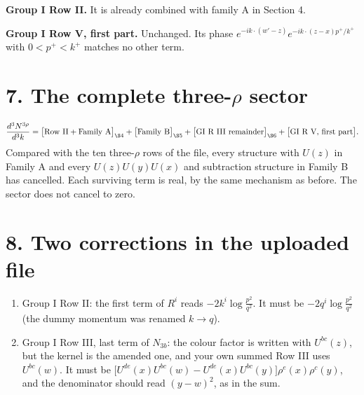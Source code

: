 \documentclass[10pt]{article}
\begin{document}
\noindent\textbf{Group I Row II.} It is already combined with family A in Section 4.

\noindent\textbf{Group I Row V, first part.} Unchanged. Its phase $e^{-ik\cdot(w'-z)}e^{-ik\cdot(z-x)p^{+}/k^{+}}$ with $0<p^{+}<k^{+}$ matches no other term.

\section*{7. The complete three-$\rho$ sector}
\begin{equation}
\frac{d^{3}N^{3\rho}}{d^{3}k}=\big[\text{Row II}+\text{Family A}\big]_{\S4}+\big[\text{Family B}\big]_{\S5}+\big[\text{GI R III remainder}\big]_{\S6}+\big[\text{GI R V, first part}\big].
\end{equation}
Compared with the ten three-$\rho$ rows of the file, every structure with $U(z)$ in Family A and every $U(z)U(y)U(x)$ and subtraction structure in Family B has cancelled. Each surviving term is real, by the same mechanism as before. The sector does not cancel to zero.

\section*{8. Two corrections in the uploaded file}
\begin{enumerate}
\item Group I Row II: the first term of $R^{i}$ reads $-2k^{i}\log\frac{p^{2}}{q^{2}}$. It must be $-2q^{i}\log\frac{p^{2}}{q^{2}}$ (the dummy momentum was renamed $k\to q$).
\item Group I Row III, last term of $N_{3b}$: the colour factor is written with $U^{bc}(z)$, but the kernel is the amended one, and your own summed Row III uses $U^{bc}(w)$. It must be $\big[U^{de}(x)U^{bc}(w)-U^{de}(x)U^{bc}(y)\big]\rho^{e}(x)\rho^{c}(y)$, and the denominator should read $(y-w)^{2}$, as in the sum.
\end{enumerate}
\end{document}
